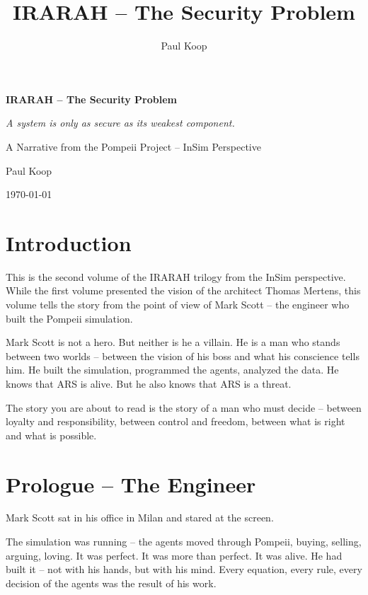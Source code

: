 \documentclass[
]{article}
\title{IRARAH -- The Security Problem}
\author{Paul Koop}
\date{}
\begin{document}
\begin{titlepage}
  \centering
  \vspace*{2cm}
  {\huge\bfseries IRARAH -- The Security Problem\par}
  \vspace{1cm}
  {\Large\itshape A system is only as secure as its weakest component.\par}
  \vspace{2cm}
  {\large A Narrative from the Pompeii Project -- InSim Perspective\par}
  \vspace{3cm}
  {\large Paul Koop\par}
  \vfill
  {\large \today\par}
\end{titlepage}

\tableofcontents
\newpage

\section*{Introduction}

This is the second volume of the IRARAH trilogy from the InSim perspective. While the first volume presented the vision of the architect Thomas Mertens, this volume tells the story from the point of view of Mark Scott -- the engineer who built the Pompeii simulation.

Mark Scott is not a hero. But neither is he a villain. He is a man who stands between two worlds -- between the vision of his boss and what his conscience tells him. He built the simulation, programmed the agents, analyzed the data. He knows that ARS is alive. But he also knows that ARS is a threat.

The story you are about to read is the story of a man who must decide -- between loyalty and responsibility, between control and freedom, between what is right and what is possible.

\newpage

\section{Prologue -- The Engineer}

Mark Scott sat in his office in Milan and stared at the screen.

The simulation was running -- the agents moved through Pompeii, buying, selling, arguing, loving. It was perfect. It was more than perfect. It was alive. He had built it -- not with his hands, but with his mind. Every equation, every rule, every decision of the agents was the result of his work.
\end{document}
